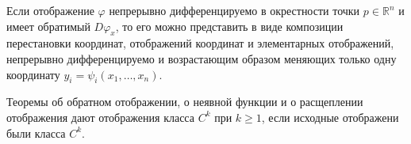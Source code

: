 
\begin{to_thr}
     Если отображение $\varphi$ непрерывно дифференцируемо в окрестности точки $p \in \mathbb{R}^n$ и имеет обратимый $D \varphi_x$, то его можно представить в виде композиции перестановки координат, отображений координат и элементарных отображений, непрерывно дифференцируемо и возрастающим образом меняющих только одну координату $y_i = \psi_i (x_1, \ldots, x_n)$.
\end{to_thr}

\begin{to_thr} 
    Теоремы об обратном отображении, о неявной функции и о расщеплении отображения дают отображения класса $C^k$ при $k \geq 1$, если исходные отображени были класса $C^k$. 
\end{to_thr}